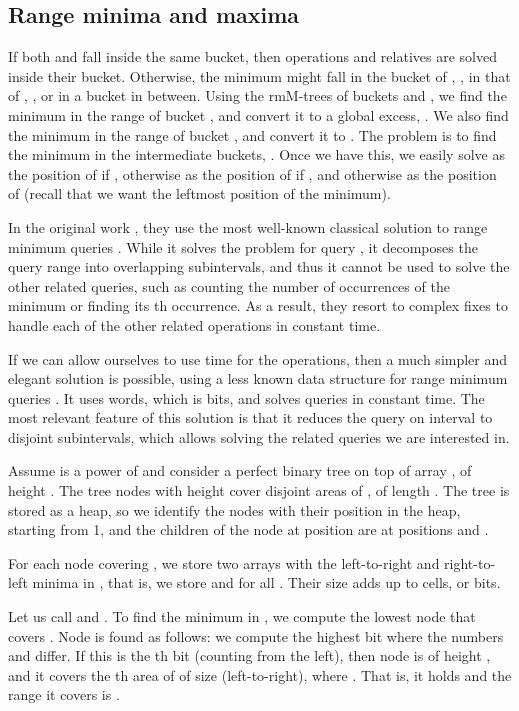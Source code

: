 \documentclass[11pt]{article}
\newcommand{\0}{\mathit{0}}
\newcommand{\1}{\mathit{1}}
\begin{document}
\subsection{Range minima and maxima} \label{sec:rmq-large}

If both  and  fall inside the same bucket, then operations  
and relatives are solved inside their bucket.
Otherwise, the minimum might fall in the bucket of , , in that of , ,
or in a bucket in between. Using the rmM-trees of buckets  and , we
find the minimum  in the range  of bucket 
, and convert it to a global excess, . 
We also find the minimum  in the range  of 
bucket , and convert it to . The 
problem is to find the minimum in the intermediate buckets,
. Once we have this, we easily
solve  as the position of  if ,
otherwise as the position of  if , and otherwise as the
position of  (recall that we want the leftmost position of the minimum).

In the original work \cite{NS14}, they use the most well-known classical
solution to range minimum queries \cite{BF00}. While it solves the problem
for query , it decomposes the query range  into 
overlapping subintervals, and thus it cannot be used to solve the other related
queries, such as counting the number of occurrences of the minimum or finding
its th occurrence. As a result, they resort to complex fixes to handle
each of the other related operations in constant time.

If we can allow ourselves to use  time for the operations,
then a much simpler and elegant solution is possible, using a less known data
structure for range minimum queries \cite{YA10}. It uses  
words, which is  bits, and solves queries in constant time.
The most relevant feature of this solution is that it reduces the query on
interval  to disjoint subintervals, which allows solving the
related queries we are interested in.

Assume  is a power of  and consider a perfect binary tree on top of 
array , of height . The tree nodes with height
 cover disjoint areas of , of length . The tree is stored as a
heap, so we identify the nodes with their position in the heap, starting from
1, and the children of the node at position  are at positions  
and .

For each node  covering , we store two arrays with the
left-to-right and right-to-left minima in , that is, we store
 and
 for all .
Their size adds up to  cells, or
 bits.

Let us call  and . To find the minimum in , we 
compute the lowest node  that covers . Node  is found as follows:
we compute the highest bit where the numbers  and  differ. If this is
the th bit (counting from the left), then node  is of height , and it 
covers the th area of  of size  (left-to-right), where
. That is, it holds  and the range
it covers is .
\end{document}
